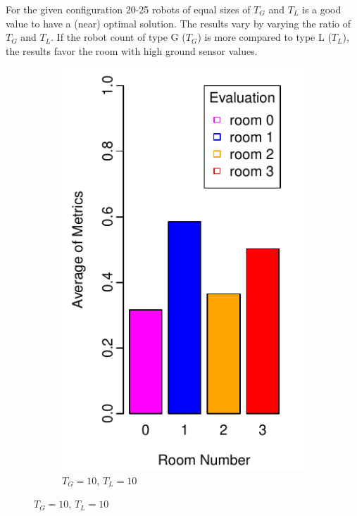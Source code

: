 \documentclass{llncs}
\begin{document}
	For the given configuration 20-25 robots of equal sizes of $T_G$ and $T_L$ is a good value to have a (near) optimal solution. The results vary by varying the ratio of $T_G$ and $T_L$. If the robot count of type G ($T_G$) is more compared to type L ($T_L$), the results favor the room with high ground sensor values.	
	
	
	\begin{figure}[h!]
        \centering
        \begin{subfigure}[b]{0.25\textwidth}
                \includegraphics[width=\textwidth]{PLOT/EVAL/eval1}
                \caption{$T_G = 10$, $T_L = 10$}

\end{subfigure}
\end{figure}
\end{document}
